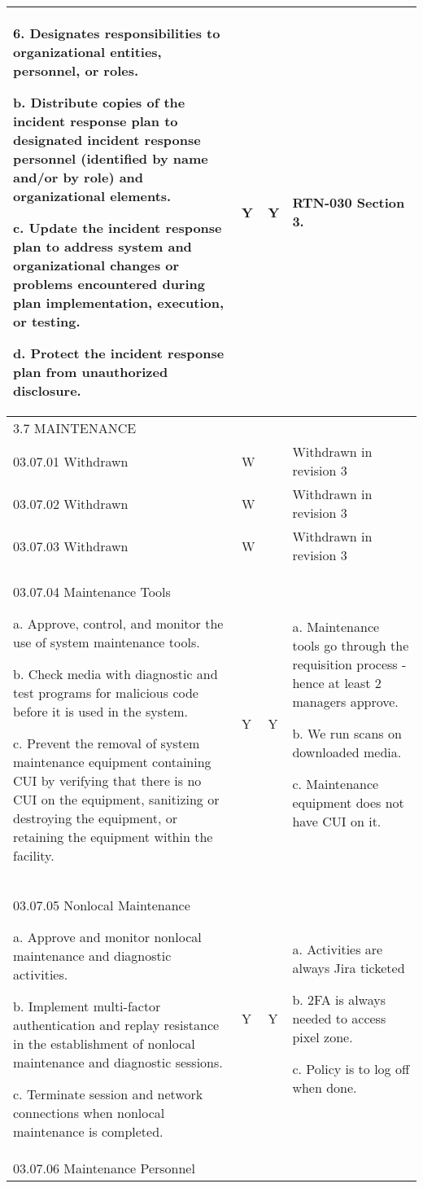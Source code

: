 \begin{longtable} {|p{}|p{}|p{}|p{} |}
{6. Designates responsibilities to organizational entities, personnel, or roles.

b. Distribute copies of the incident response plan to designated incident response personnel (identified by name and/or by role) and organizational elements.

c. Update the incident response plan to address system and organizational changes or problems encountered during plan implementation, execution, or testing.

d. Protect the incident response plan from unauthorized disclosure.}&{Y}&{Y}&{RTN-030 Section 3.} \\ \hline
{3.7 MAINTENANCE}&&& \\ \hline
{03.07.01 Withdrawn}&{W}&{}&{Withdrawn in revision 3} \\ \hline
{03.07.02 Withdrawn}&{W}&{}&{Withdrawn in revision 3} \\ \hline
{03.07.03 Withdrawn}&{W}&{}&{Withdrawn in revision 3} \\ \hline
{03.07.04 Maintenance Tools

a. Approve, control, and monitor the use of system maintenance tools.

b. Check media with diagnostic and test programs for malicious code before it is used in the system.

c. Prevent the removal of system maintenance equipment containing CUI by verifying that there is no CUI on the equipment, sanitizing or destroying the equipment, or retaining the equipment within the facility.}&{Y}&{Y}&{a. Maintenance tools go through the requisition process - hence at least 2 managers approve. 

b. We run scans on downloaded media.

c. Maintenance equipment does not have CUI on it. } \\ \hline
{03.07.05 Nonlocal Maintenance

a. Approve and monitor nonlocal maintenance and diagnostic activities.

b. Implement multi-factor authentication and replay resistance in the establishment of nonlocal maintenance and diagnostic sessions.

c. Terminate session and network connections when nonlocal maintenance is completed.}&{Y}&{Y}&{a. Activities are always Jira ticketed

b. 2FA is always needed to access pixel zone.

c. Policy is to log off when done.} \\ \hline
{03.07.06 Maintenance Personnel

}
\end{longtable}
